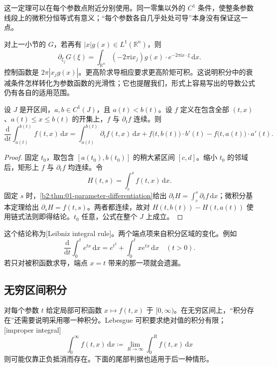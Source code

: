 这一定理可以在每个参数点附近分别使用。同一零集以外的 \(C^1\) 条件，使整条参数线段上的微积分恒等式有意义；“每个参数各自几乎处处可导”本身没有保证这一点。

\ProseParagraphBreak

对上一小节的 \(G\)，若再有 \(|x|g(x)\in L^1(\mathbb R^n)\)，则
\[
\partial_{\xi_j}G(\xi)=\int_{\mathbb R^n}(-2\pi\mathrm{i}x_j)g(x)\cdot e^{-2\pi\mathrm{i}x\cdot\xi}\,\mathrm{d}x.
\]
控制函数是 \(2\pi|x_jg(x)|\)。更高阶求导相应要求更高阶矩可积。这说明积分中的衰减条件怎样转化为参数函数的光滑性；它也提醒我们，形式上容易写出的导数公式仍有各自的适用范围。

\begin{proposition}\label{b2:prop:01-leibniz-integral}
设 \(J\) 是开区间，\(a,b\in C^1(J)\)，且 \(a(t)<b(t)\)。设 \(f\) 定义在包含全部 \((t,x)\)、\(a(t)\leq x\leq b(t)\) 的开集上，\(f\) 与 \(\partial_t f\) 连续。则
\[
\frac{\mathrm{d}}{\mathrm{d}t}\int_{a(t)}^{b(t)}f(t,x)\,\mathrm{d}x
=\int_{a(t)}^{b(t)}\partial_t f(t,x)\,\mathrm{d}x
+f\bigl(t,b(t)\bigr)\cdot b'(t)-f\bigl(t,a(t)\bigr)\cdot a'(t).
\]
\end{proposition}
\begin{proof}
固定 \(t_0\)，取包含 \([a(t_0),b(t_0)]\) 的稍大紧区间 \([c,d]\)。缩小 \(t_0\) 的邻域后，矩形上 \(f\) 与 \(\partial_t f\) 均连续。令
\[
H(t,s)=\int_c^s f(t,x)\,\mathrm{d}x.
\]
固定 \(s\) 时，\cref{b2:thm:01-parameter-differentiation}给出 \(\partial_t H=\int_c^s\partial_t f\,\mathrm{d}x\)；微积分基本定理给出 \(\partial_s H=f(t,s)\)。两者都连续，故对 \(H(t,b(t))-H(t,a(t))\) 使用链式法则即得结论。\(t_0\) 任意，公式在整个 \(J\) 上成立。
\end{proof}

这个结论称为[Leibniz integral rule]。两个端点项来自积分区域的变化。例如
\[
\frac{\mathrm{d}}{\mathrm{d}t}\int_0^t e^{tx}\,\mathrm{d}x
=e^{t^2}+\int_0^t xe^{tx}\,\mathrm{d}x\quad(t>0).
\]
若只对被积函数求导，端点 \(x=t\) 带来的那一项就会遗漏。

\subsection{无穷区间积分}
\label{b2:subsec:010303}

对每个参数 \(t\) 给定局部可积函数 \(x\mapsto f(t,x)\) 于 \([0,\infty)\)。在无穷区间上，“积分存在”还需要说明采用哪一种积分。Lebesgue 可积要求绝对值的积分有限；[improper integral]
\[
\int_0^\infty f(t,x)\,\mathrm{d}x
\coloneqq\lim_{R\to\infty}\int_0^R f(t,x)\,\mathrm{d}x
\]
则可能仅靠正负抵消而存在。下面的尾部判据也适用于后一种情形。

